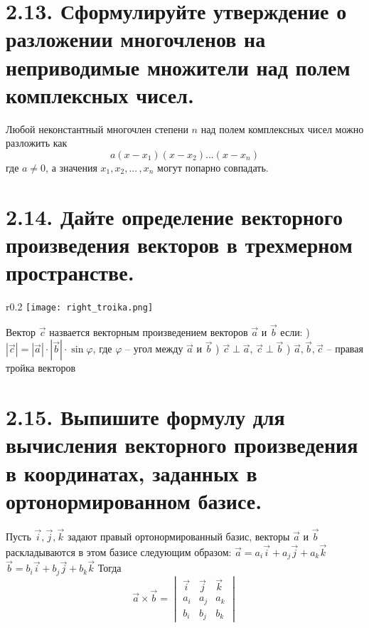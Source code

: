 \documentclass{article}
\begin{document}
\section*{\LARGE 2.13. Сформулируйте утверждение о разложении многочленов на неприводимые множители над полем комплексных чисел.  }

Любой неконстантный многочлен степени $n$ над полем комплексных чисел можно разложить как 
$$ a(x - x_1)(x - x_2)...(x - x_n) $$
где $a \ne 0$, а значения $x_1, x_2, ...\,, x_n$ могут попарно совпадать.

\section*{\LARGE 2.14. Дайте определение векторного произведения векторов в трехмерном пространстве. }

\begin{wrapfigure}{r}{0.2\textwidth}
    \centering
    \texttt{[image: right\_troika.png]}
\end{wrapfigure}
Вектор $\vec{c}$ назвается векторным произведением векторов $\vec{a}$ и $\vec{b}$ если:
) $|\vec{c}| = |\vec{a}|\cdot|\vec{b}|\cdot\sin{\varphi}$, где $\varphi$ -- угол между $\vec{a}$ и $\vec{b}$
) $\vec{c} \perp \vec{a},\, \vec{c} \perp \vec{b}$
) $\vec{a}, \vec{b}, \vec{c}$ -- правая тройка векторов

\section*{\LARGE 2.15. Выпишите формулу для вычисления векторного произведения в координатах, заданных в ортонормированном базисе.  }

Пусть $\vec{i}, \vec{j}, \vec{k}$ задают правый ортонормированный базис, векторы $\vec{a}$ и $\vec{b}$ раскладываются в этом базисе следующим образом:
\newline $\vec{a} = a_i\vec{i} + a_j\vec{j} + a_k\vec{k}$
\newline $\vec{b} = b_i\vec{i} + b_j\vec{j} + b_k\vec{k}$
\newline Тогда 
$$\vec{a} \times \vec{b} = 
\begin{vmatrix}
\vec{i} & \vec{j} & \vec{k} \\
a_i & a_j & a_k \\
b_i & b_j & b_k
\end{vmatrix}$$
\end{document}
